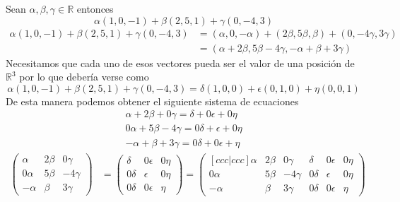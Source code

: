 \documentclass[letterpaper]{article}
\newcommand{\R}{\mathds{R}}
\renewcommand{\*}{\cdot}
\theoremstyle{definition}
\begin{document}
	Sean $ \alpha, \beta, \gamma \in \R $ entonces
	\[ \alpha(1,0,-1) + \beta(2,5,1) + \gamma(0,-4,3)  \]
	\begin{align*}
		\alpha(1,0,-1)+ \beta(2,5,1)+ \gamma(0,-4,3) & = (\alpha,0,-\alpha) + (2\beta,5\beta,\beta) + (0,-4\gamma,3\gamma)\\
		& = (\alpha + 2\beta ,5\beta -4\gamma,-\alpha + \beta +3\gamma)
	\end{align*}
	Necesitamos que cada uno de esos vectores pueda ser el valor de una posición de $ \R^3 $ por lo que debería verse como \[ 	\alpha(1,0,-1)+ \beta(2,5,1)+ \gamma(0,-4,3) = \delta(1,0,0) + \epsilon(0,1,0) + \eta(0,0,1) \] De esta manera podemos obtener el siguiente sistema de ecuaciones
	\begin{align*}
		\alpha + 2\beta + 0\gamma = \delta + 0\epsilon + 0\eta\\
		0\alpha + 5\beta -4\gamma = 0\delta + \epsilon + 0\eta\\
		-\alpha + \beta +3\gamma = 0\delta +0\epsilon + \eta
	\end{align*}
	\begin{align*}
		\begin{pmatrix}
			\alpha & 2\beta & 0\gamma\\
			0\alpha & 5\beta & -4\gamma\\
			-\alpha & \beta & 3\gamma
		\end{pmatrix}
		&= 		\begin{pmatrix}
		\delta & 0\epsilon & 0\eta\\
		0\delta & \epsilon & 0\eta\\
		0\delta & 0\epsilon & \eta
		\end{pmatrix}  = 		 \begin{pmatrix}[ccc|ccc]
		\alpha & 2\beta & 0\gamma & \delta & 0\epsilon & 0\eta\\
		0\alpha & 5\beta & -4\gamma& 0\delta & \epsilon & 0\eta\\
		-\alpha & \beta & 3\gamma & 0\delta & 0\epsilon & \eta
		\end{pmatrix} 
	\end{align*}
\end{document}
